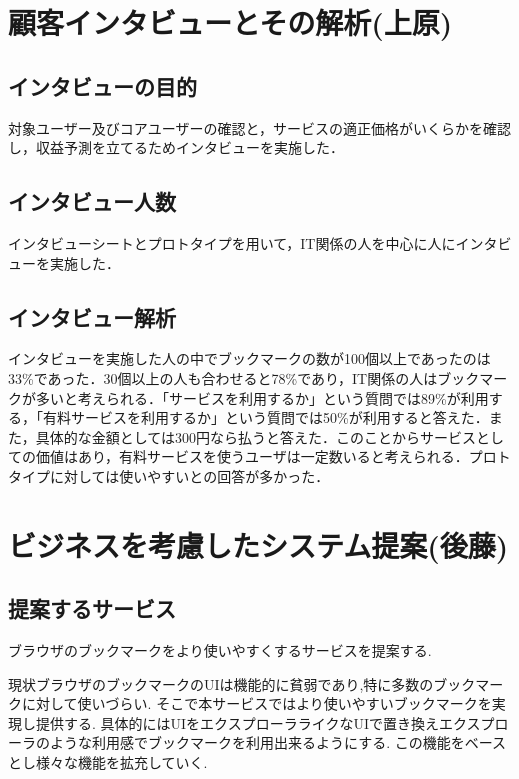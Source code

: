 \documentclass[a4paper,10pt,fleqn]{jsarticle}
\begin{document}
\newpage

\section{顧客インタビューとその解析(上原)}

\subsection{インタビューの目的}
対象ユーザー及びコアユーザーの確認と，サービスの適正価格がいくらかを確認し，収益予測を立てるためインタビューを実施した．

\subsection{インタビュー人数}
インタビューシートとプロトタイプを用いて，IT関係の人を中心に人にインタビューを実施した．

\subsection{インタビュー解析}
インタビューを実施した人の中でブックマークの数が100個以上であったのは33\%であった．30個以上の人も合わせると78\%であり，IT関係の人はブックマークが多いと考えられる．「サービスを利用するか」という質問では89\%が利用する，「有料サービスを利用するか」という質問では50\%が利用すると答えた．また，具体的な金額としては300円なら払うと答えた．このことからサービスとしての価値はあり，有料サービスを使うユーザは一定数いると考えられる．プロトタイプに対しては使いやすいとの回答が多かった．

\section{ビジネスを考慮したシステム提案(後藤)}
\subsection{提案するサービス}
ブラウザのブックマークをより使いやすくするサービスを提案する.
\par
現状ブラウザのブックマークのUIは機能的に貧弱であり,特に多数のブックマークに対して使いづらい. そこで本サービスではより使いやすいブックマークを実現し提供する. 具体的にはUIをエクスプローラライクなUIで置き換えエクスプローラのような利用感でブックマークを利用出来るようにする. この機能をベースとし様々な機能を拡充していく.
\end{document}
